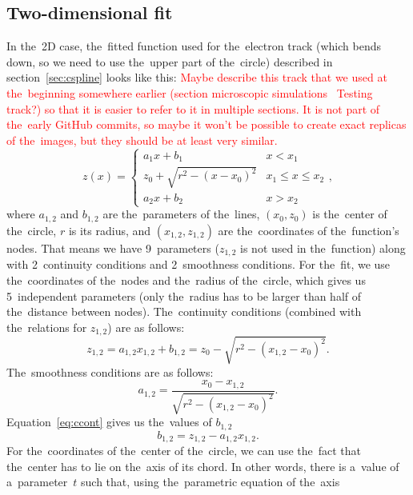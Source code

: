 		\subsection{Two-dimensional fit}
			In the~2D case, the~fitted function used for the~electron track (which bends down, so we need to use the~upper part of the~circle) described in section~\ref{sec:cspline} looks like this: \textcolor{red}{Maybe describe this track that we used at the~beginning somewhere earlier (section microscopic simulations \textrightarrow~Testing track?) so that it is easier to refer to it in multiple sections. It is not part of the~early GitHub commits, so maybe it won't be possible to create exact replicas of the~images, but they should be at least very similar.}
				\begin{equation}
					\label{eq:clines2d}
					z(x) = \begin{cases}
								a_1x+b_1 & x<x_1\\
								z_0+\sqrt{r^2-(x-x_0)^2} & x_1\leq x\leq x_2\\
								a_2x+b_2 & x>x_2
						   \end{cases},
				\end{equation}
			where $a_{1,2}$ and $b_{1,2}$ are the~parameters of the~lines, $(x_0,z_0)$ is the~center of the~circle, $r$ is its radius, and $(x_{1,2},z_{1,2})$ are the~coordinates of the~function's nodes. That means we have 9~parameters ($z_{1,2}$ is not used in the~function) along with 2~continuity conditions and 2~smoothness conditions. For the~fit, we use the~coordinates of the~nodes and the~radius of the~circle, which gives us 5~independent parameters (only the~radius has to be larger than half of the~distance between nodes). The~continuity conditions (combined with the~relations for $z_{1,2}$) are as follows:
				\begin{equation}
					\label{eq:ccont}
					z_{1,2} = a_{1,2}x_{1,2}+b_{1,2} = z_0-\sqrt{r^2-(x_{1,2}-x_0)^2}.
				\end{equation}
			The~smoothness conditions are as follows:
				\begin{equation}
					\label{eq:a12}
					a_{1,2} = \frac{x_0-x_{1,2}}{\sqrt{r^2-(x_{1,2}-x_0)^2}}.
				\end{equation}
			Equation~\ref{eq:ccont} gives us the~values of $b_{1,2}$
				\begin{equation}
					\label{eq:b12}
					b_{1,2} = z_{1,2} - a_{1,2} x_{1,2}.
				\end{equation}
			For the~coordinates of the~center of the~circle, we can use the~fact that the~center has to lie on the~axis of its chord. In other words, there is a~value of a~parameter~$t$ such that, using the~parametric equation of the~axis
